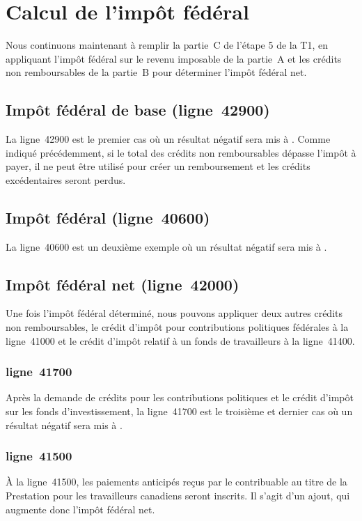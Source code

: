 \section{Calcul de l'impôt fédéral}
\begin{intro}
	Nous continuons maintenant à remplir la partie~C de l'étape 5 de la T1, en appliquant l'impôt fédéral sur le revenu imposable de la partie~A et les crédits non remboursables de la partie~B pour déterminer l'impôt fédéral net.
\end{intro}


\subsection{Impôt fédéral de base (ligne~42900)}
La ligne~42900 est le premier cas où un résultat négatif sera mis à  \fg{}. Comme indiqué précédemment, si le total des crédits non remboursables dépasse l'impôt à payer, il ne peut être utilisé pour créer un remboursement et les crédits excédentaires seront perdus.


\subsection{Impôt fédéral (ligne~40600)}
La ligne~40600 est un deuxième exemple où un résultat négatif sera mis à  \fg{}.


\subsection{Impôt fédéral net (ligne~42000)}
Une fois l'impôt fédéral déterminé, nous pouvons appliquer deux autres crédits non remboursables, le crédit d'impôt pour contributions politiques fédérales à la ligne~41000 et le crédit d'impôt relatif à un fonds de travailleurs à la ligne~41400.

\subsubsection{ligne~41700}
Après la demande de crédits pour les contributions politiques et le crédit d'impôt sur les fonds d'investissement, la ligne~41700 est le troisième et dernier cas où un résultat négatif sera mis à   \fg{}.

\subsubsection{ligne~41500}
À la ligne~41500, les paiements anticipés reçus par le contribuable au titre de la Prestation pour les travailleurs canadiens seront inscrits. Il s'agit d'un ajout, qui augmente donc l'impôt fédéral net.

